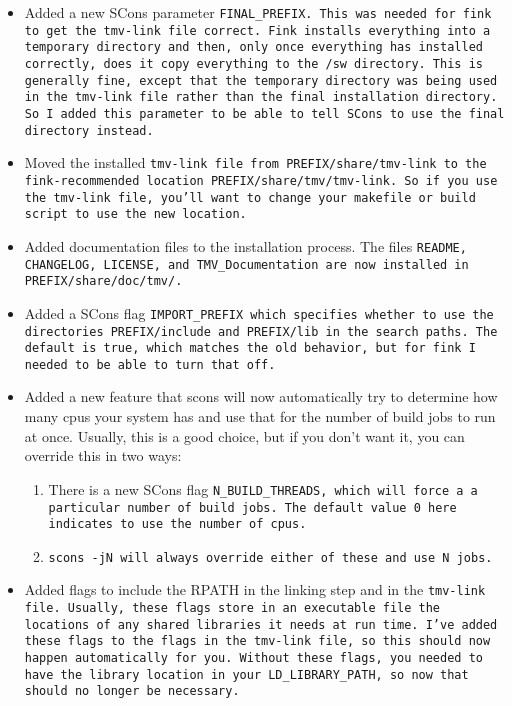 \begin{itemize}

\item
Added a new SCons parameter \tt{FINAL\_PREFIX}.  This was needed for fink to 
get the \tt{tmv-link} file correct.  Fink installs everything into a temporary
directory and then, only once everything has installed correctly, does
it copy everything to the \tt{/sw} directory.  This is generally fine,
except that the temporary directory was being used in the \tt{tmv-link}
file rather than the final installation directory.  So I added this
parameter to be able to tell SCons to use the final directory instead.

\item
Moved the installed \tt{tmv-link} file from \tt{PREFIX/share/tmv-link} to the fink-recommended location \tt{PREFIX/share/tmv/tmv-link}.  So if you use the 
\tt{tmv-link} file, you'll want to change your makefile or build script to 
use the new location.

\item
Added documentation files to the installation process.  The files \tt{README},
\tt{CHANGELOG}, \tt{LICENSE}, and \tt{TMV\_Documentation} are now installed in
\tt{PREFIX/share/doc/tmv/}.

\item
Added a SCons flag \tt{IMPORT\_PREFIX} which specifies whether to use the directories
\tt{PREFIX/include} and \tt{PREFIX/lib} in the search paths.  The default is true,
which matches the old behavior, but for fink I needed to be able to 
turn that off.

\item
Added a new feature that scons will now automatically try to determine 
how many cpus your system has and use that for the number of build jobs 
to run at once.  Usually, this is a good choice, but if you don't want
it, you can override this in two ways:

\begin{enumerate}
\item There is a new SCons flag \tt{N\_BUILD\_THREADS}, which will force a
a particular number of build jobs.
The default value 0 here indicates to use the number of cpus.

\item \tt{scons -jN} will always override either of these and use N jobs.
\end{enumerate}

\item
Added flags to include the RPATH in the linking step and in the \tt{tmv-link} file.  
Usually, these flags store in an executable file the locations of any shared libraries it needs at run time.  I've added these flags to the flags in
the \tt{tmv-link} file, so this should now happen automatically for you.  Without these flags, you needed to have the library location in your \tt{LD\_LIBRARY\_PATH}, so now that should no longer be necessary.


\end{itemize}
